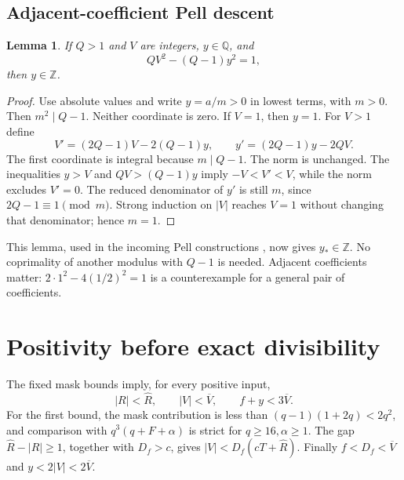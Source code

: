 \documentclass[11pt]{article}
\newtheorem{lemma}[theorem]{Lemma}
\theoremstyle{remark}
\newcommand{\Z}{\mathbb Z}
\newcommand{\Q}{\mathbb Q}
\begin{document}
\subsection{Adjacent-coefficient Pell descent}
\begin{lemma}\label{lem:descent}
If $Q>1$ and $V$ are integers, $y\in\Q$, and
\[
 QV^2-(Q-1)y^2=1,
\]
then $y\in\Z$.
\end{lemma}
\begin{proof}
Use absolute values and write $y=a/m>0$ in lowest terms, with $m>0$.
Then $m^2\mid Q-1$. Neither coordinate is zero. If $V=1$, then $y=1$.
For $V>1$ define
\[
 V'=(2Q-1)V-2(Q-1)y,\qquad
 y'=(2Q-1)y-2QV.
\]
The first coordinate is integral because $m\mid Q-1$. The norm is
unchanged. The inequalities $y>V$ and $QV>(Q-1)y$ imply
$-V<V'<V$, while the norm excludes $V'=0$. The reduced denominator
of $y'$ is still $m$, since $2Q-1\equiv1\pmod m$.
Strong induction on $|V|$ reaches $V=1$ without changing that denominator;
hence $m=1$.
\end{proof}
This lemma, used in the incoming Pell constructions \cite{cones,joint},
now gives $y_*\in\Z$. No coprimality of another modulus with $Q-1$ is
needed. Adjacent coefficients matter: $2\cdot1^2-4(1/2)^2=1$ is a
counterexample for a general pair of coefficients.

\section{Positivity before exact divisibility}\label{sec:bootstrap}

The fixed mask bounds imply, for every positive input,
\begin{equation}\label{eq:majorants}
 |R|<\widehat R,\qquad |V|<\overline V,\qquad f+y<3\overline V.
\end{equation}
For the first bound, the mask contribution is less than
$(q-1)(1+2q)<2q^2$, and comparison with $q^3(q+F+\alpha)$ is strict
for $q\ge16,\alpha\ge1$. The gap $\widehat R-|R|\ge1$, together
with $D_f>c$, gives $|V|<D_f(cT+\widehat R)$. Finally
$f<D_f<\overline V$ and $y<2|V|<2\overline V$.
\end{document}

